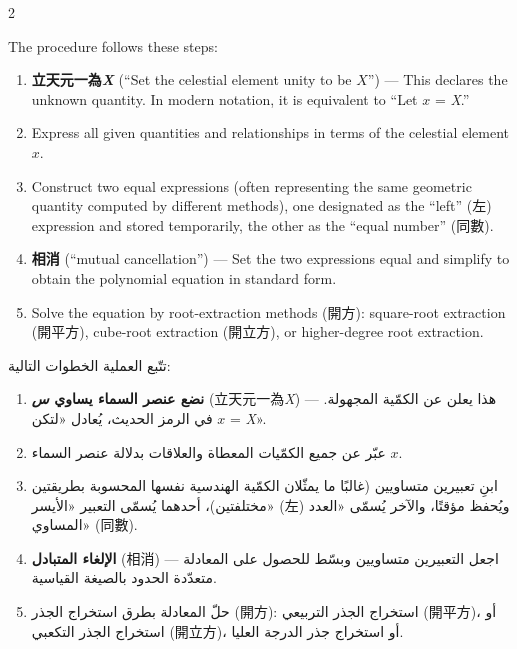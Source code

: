 \documentclass[11pt,a4paper]{article}
\newcommand{\ar}[1]{\arabicfont\beginR #1\endR}
\begin{document}
\begin{paracol}{2}

The procedure follows these steps:

\begin{enumerate}[leftmargin=2em]
  \item \textbf{立天元一為\textit{X}} (``Set the celestial element unity to be $X$'') --- This declares the unknown quantity. In modern notation, it is equivalent to ``Let $x$ = \textit{X}.''
  
  \item Express all given quantities and relationships in terms of the celestial element $x$.
  
  \item Construct two equal expressions (often representing the same geometric quantity computed by different methods), one designated as the ``left'' (左) expression and stored temporarily, the other as the ``equal number'' (同數).
  
  \item \textbf{相消} (``mutual cancellation'') --- Set the two expressions equal and simplify to obtain the polynomial equation in standard form.
  
  \item Solve the equation by root-extraction methods (開方): square-root extraction (開平方), cube-root extraction (開立方), or higher-degree root extraction.
\end{enumerate}

\switchcolumn

\ar{تتّبع العملية الخطوات التالية:}

\begin{enumerate}[leftmargin=2em,rightmargin=0em]
  \item \ar{\textbf{نضع عنصر السماء يساوي \textit{س}} (立天元一為\textit{X}) — هذا يعلن عن الكمّية المجهولة. في الرمز الحديث، يُعادل «لتكن $x$ = \textit{X}».}

  \item \ar{عبّر عن جميع الكمّيات المعطاة والعلاقات بدلالة عنصر السماء $x$.}

  \item \ar{ابنِ تعبيرين متساويين (غالبًا ما يمثّلان الكمّية الهندسية نفسها المحسوبة بطريقتين مختلفتين)، أحدهما يُسمّى التعبير «الأيسر» (左) ويُحفظ مؤقتًا، والآخر يُسمّى «العدد المساوي» (同數).}

  \item \ar{\textbf{الإلغاء المتبادل} (相消) — اجعل التعبيرين متساويين وبسّط للحصول على المعادلة متعدّدة الحدود بالصيغة القياسية.}

  \item \ar{حلّ المعادلة بطرق استخراج الجذر (開方): استخراج الجذر التربيعي (開平方)، أو استخراج الجذر التكعبي (開立方)، أو استخراج جذر الدرجة العليا.}
\end{enumerate}

\end{paracol}
\end{document}
